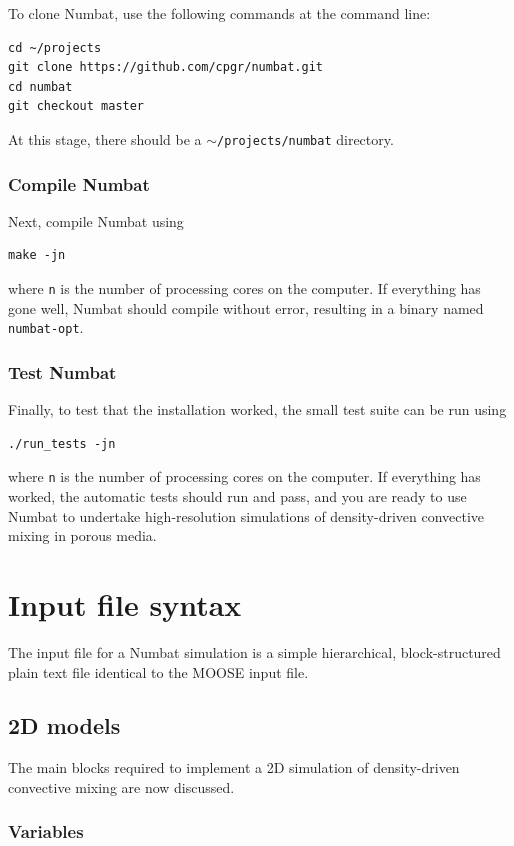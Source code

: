 \documentclass[11pt, a4paper]{csiroreport2012}
\begin{document}
To clone Numbat, use the following commands at the command line:

\begin{verbatim}
cd ~/projects
git clone https://github.com/cpgr/numbat.git
cd numbat
git checkout master
\end{verbatim}

At this stage, there should be a \texttt{$\sim$/projects/numbat} directory.

\subsubsection*{Compile Numbat}
Next, compile Numbat using
\begin{verbatim}
make -jn
\end{verbatim}
where \texttt{n} is the number of processing cores on the computer. If everything has gone well, Numbat should compile without error, resulting in a binary named \texttt{numbat-opt}.

\subsubsection*{Test Numbat}
Finally, to test that the installation worked, the small test suite can be run using
\begin{verbatim}
./run_tests -jn
\end{verbatim}
where \texttt{n} is the number of processing cores on the computer. If everything has worked, the automatic tests should run and pass, and you are ready to use Numbat to undertake high-resolution simulations of density-driven convective mixing in porous media.

\section{Input file syntax}

The input file for a Numbat simulation is a simple hierarchical, block-structured plain text file identical to the MOOSE input file. 

\subsection{2D models}

The main blocks required to implement a 2D simulation of density-driven convective mixing are now discussed.
\subsubsection*{Variables}
\end{document}

